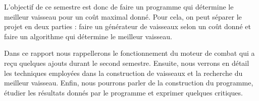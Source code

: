 	
	L'objectif de ce semestre est donc de faire un programme qui détermine le meilleur vaisseau pour un coût maximal donné. Pour cela, on peut séparer le projet en deux parties : faire un générateur de vaisseaux selon un coût donné et faire un algorithme qui détermine le meilleur vaisseau.

	Dans ce rapport nous rappellerons le fonctionnement du moteur de combat qui a reçu quelques ajouts durant le second semestre. Ensuite, nous verrons en détail les techniques employées dans la construction de vaisseaux et la recherche du meilleur vaisseau. Enfin, nous pourrons parler de la construction du programme, étudier les résultats donnés par le programme et exprimer quelques critiques.
